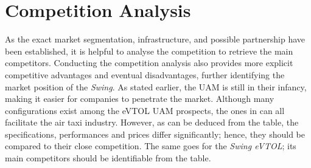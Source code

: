\section{Competition Analysis}
\label{sec:Competition_Analysis}
As the exact market segmentation, infrastructure, and possible partnership have been established, it is helpful to analyse the competition to retrieve the main competitors.
Conducting the competition analysis also provides more explicit competitive advantages and eventual disadvantages, further identifying the market position of the \textit{Swing}.
As stated earlier, the UAM is still in their infancy, making it easier for companies to penetrate the market.
Although many configurations exist among the eVTOL UAM prospects, the ones in  can all facilitate the air taxi industry.
However, as can be deduced from the table, the specifications, performances and prices differ significantly; hence, they should be compared to their close competition.
The same goes for the \textit{Swing eVTOL}; its main competitors should be identifiable from the table.

